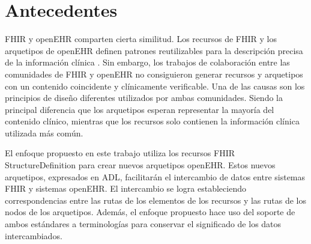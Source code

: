 \section{Antecedentes}





FHIR y openEHR comparten cierta similitud. Los recursos de FHIR y los arquetipos de openEHR definen patrones reutilizables para la descripción precisa de la información clínica \cite{Bosca15}. Sin embargo, los trabajos de colaboración entre las comunidades de FHIR y openEHR \cite{Collaboration} no consiguieron generar recursos y arquetipos con un contenido coincidente y clínicamente verificable. Una de las causas son los principios de diseño diferentes utilizados por ambas comunidades. Siendo la principal diferencia que los arquetipos esperan representar la mayoría del contenido clínico, mientras que los recursos solo contienen la información clínica utilizada más común.

El enfoque propuesto en este trabajo utiliza los recursos FHIR StructureDefinition para crear nuevos arquetipos openEHR. Estos nuevos arquetipos, expresados en ADL, facilitarán el intercambio de datos entre sistemas FHIR y sistemas openEHR. El intercambio se logra estableciendo correspondencias entre las rutas de los elementos de los recursos y las rutas de los nodos de los arquetipos. Además, el enfoque propuesto hace uso del soporte de ambos estándares a terminologías para conservar el significado de los datos intercambiados.
